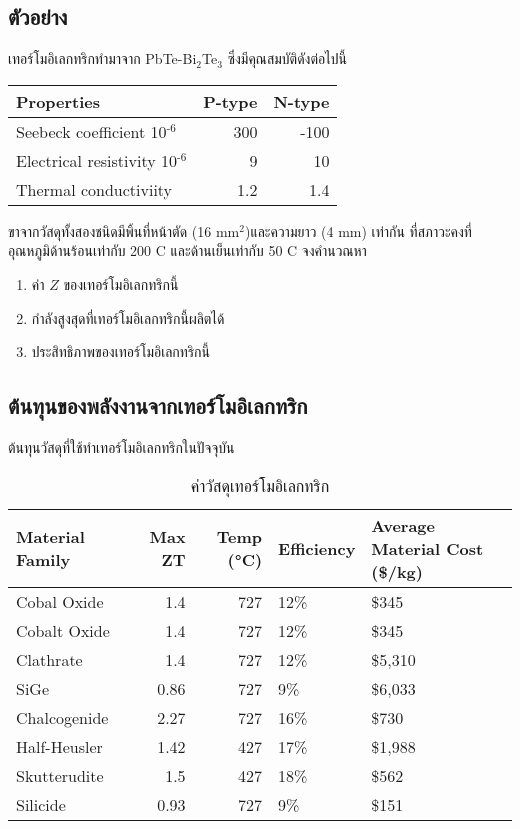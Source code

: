 \documentclass[11pt]{article}
\begin{document}
\subsection{ตัวอย่าง}
\label{sec:orgfd6cf17}
เทอร์โมอิเลกทริกทำมาจาก PbTe-Bi\(_{\text{2}}\)Te\(_{\text{3}}\) ซึ่งมีคุณสมบัติดังต่อไปนี้

\begin{center}
\begin{tabular}{lrr}
\hline
Properties & P-type & N-type\\
\hline
Seebeck coefficient \texttimes{} 10\(^{\text{-6}}\) & 300 & -100\\
Electrical resistivity \texttimes{} 10\(^{\text{-6}}\) & 9 & 10\\
Thermal conductiviity & 1.2 & 1.4\\
\hline
\end{tabular}
\end{center}

ขาจากวัสดุทั้งสองชนิดมีพิ้นที่หน้าตัด (16 mm\(^2\))และความยาว (4 mm) เท่ากัน ที่สภาวะคงที่อุณหภูมิด้านร้อนเท่ากับ 200 C และด้านเย็นเท่ากับ 50 C จงคำนวณหา

\begin{enumerate}
\item ค่า \(Z\) ของเทอร์โมอิเลกทริกนี้
\item กำลังสูงสุดที่เทอร์โมอิเลกทริกนี้ผลิตได้
\item ประสิทธิภาพของเทอร์โมอิเลกทริกนี้
\end{enumerate}

\subsection{ต้นทุนของพลังงานจากเทอร์โมอิเลกทริก}
\label{sec:org66672ad}

ต้นทุนวัสดุที่ใช้ทำเทอร์โมอิเลกทริกในปัจจุบัน

\begin{table}[htbp]
\caption{\label{tab:orgf38be2f}
ค่าวัสดุเทอร์โมอิเลกทริก}
\centering
\begin{tabular}{lrrll}
\hline
Material Family & Max ZT & Temp (°C) & Efficiency & Average Material Cost (\$/kg)\\
\hline
Cobal Oxide & 1.4 & 727 & 12\% & \$345\\
Cobalt Oxide & 1.4 & 727 & 12\% & \$345\\
Clathrate & 1.4 & 727 & 12\% & \$5,310\\
SiGe & 0.86 & 727 & 9\% & \$6,033\\
Chalcogenide & 2.27 & 727 & 16\% & \$730\\
Half-Heusler & 1.42 & 427 & 17\% & \$1,988\\
Skutterudite & 1.5 & 427 & 18\% & \$562\\
Silicide & 0.93 & 727 & 9\% & \$151\\
\hline
\end{tabular}
\end{table}
\end{document}
